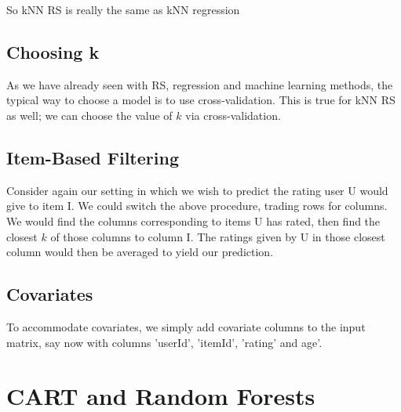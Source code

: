 So kNN RS is really the same as kNN regression

\subsection{Choosing k}

As we have already seen with RS, regression and machine learning methods, 
the typical way to choose a model is to use cross-validation.  This is
true for kNN RS as well; we can choose the value of $k$ via
cross-validation.  

% 
% 
% 

\subsection{Item-Based Filtering}

Consider again our setting in which we wish to predict the rating user U
would give to item I.  We could switch the above procedure, trading rows
for columns.  We would find the columns corresponding to items U has
rated, then find the closest $k$ of those columns to column I.  The
ratings given by U in those closest column would then be averaged to
yield our prediction.

\subsection{Covariates}

To accommodate covariates, we simply add covariate columns to the input
matrix, say now with columns 'userId', 'itemId', 'rating' and age'.

\section{CART and Random Forests}

\iffalse

